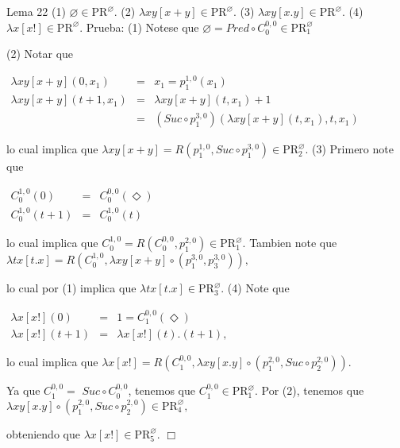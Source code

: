 Lema 22
(1) \(\varnothing \in \mathrm{PR}^{\varnothing }\).
(2) \(\lambda xy\left[ x+y\right] \in \mathrm{PR}^{\varnothing }\).
(3) \(\lambda xy\left[ x.y\right] \in \mathrm{PR}^{\varnothing }\).
(4) \(\lambda x\left[ x!\right] \in \mathrm{PR}^{\varnothing }\).
Prueba: (1) Notese que \(\varnothing =Pred\circ C_{0}^{0,0}\in \mathrm{PR} _{1}^{\varnothing }\)

(2) Notar que

\(\displaystyle \begin{array}{rcl} \lambda xy\left[ x+y\right] (0,x_{1}) & =& x_{1}=p_{1}^{1,0}(x_{1}) \\ \lambda xy\left[ x+y\right] (t+1,x_{1}) & =& \lambda xy\left[ x+y\right] (t,x_{1})+1 \\ & =& \left( Suc\circ p_{1}^{3,0}\right) \left( \lambda xy\left[ x+y\right] (t,x_{1}),t,x_{1}\right) \end{array} \)

lo cual implica que \(\lambda xy\left[ x+y\right] =R\left( p_{1}^{1,0},Suc\circ p_{1}^{3,0}\right) \in \mathrm{PR}_{2}^{\varnothing }.\)
(3) Primero note que

\(\displaystyle \begin{array}{rcl} C_{0}^{1,0}(0) & =& C_{0}^{0,0}(\Diamond ) \\ C_{0}^{1,0}(t+1) & =& C_{0}^{1,0}(t) \end{array} \)

lo cual implica que \(C_{0}^{1,0}=R\left( C_{0}^{0,0},p_{1}^{2,0}\right) \in \mathrm{PR}_{1}^{\varnothing }.\) Tambien note que
\(\displaystyle \lambda tx\left[ t.x\right] =R\left( C_{0}^{1,0},\lambda xy\left[ x+y\right] \circ \left( p_{1}^{3,0},p_{3}^{3,0}\right) \right) , \)

lo cual por (1) implica que \(\lambda tx\left[ t.x\right] \in \mathrm{PR} _{3}^{\varnothing }\).
(4) Note que

\(\displaystyle \begin{array}{rcl} \lambda x\left[ x!\right] (0) & =& 1=C_{1}^{0,0}(\Diamond ) \\ \lambda x\left[ x!\right] (t+1) & =& \lambda x\left[ x!\right] (t).(t+1), \end{array} \)

lo cual implica que
\(\displaystyle \lambda x\left[ x!\right] =R\left( C_{1}^{0,0},\lambda xy\left[ x.y\right] \circ \left( p_{1}^{2,0},Suc\circ p_{2}^{2,0}\right) \right) . \)

Ya que \(C_{1}^{0,0}=\) \(Suc\circ C_{0}^{0,0}\), tenemos que \(C_{1}^{0,0}\in \mathrm{PR}_{1}^{\varnothing }\). Por (2), tenemos que
\(\displaystyle \lambda xy\left[ x.y\right] \circ \left( p_{1}^{2,0},Suc\circ p_{2}^{2,0}\right) \in \mathrm{PR}_{4}^{\varnothing }, \)

obteniendo que \(\lambda x\left[ x!\right] \in \mathrm{PR}_{5}^{\varnothing }\). \(\Box\)
